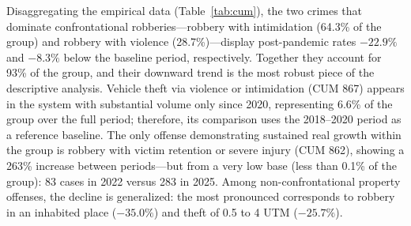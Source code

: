 \documentclass[pdflatex,sn-basic]{sn-jnl}
\begin{document}
Disaggregating the empirical data (Table~\ref{tab:cum}), the two crimes that dominate confrontational robberies---robbery with intimidation (64.3\% of the group) and robbery with violence (28.7\%)---display post-pandemic rates $-22.9\%$ and $-8.3\%$ below the baseline period, respectively. Together they account for 93\% of the group, and their downward trend is the most robust piece of the descriptive analysis. Vehicle theft via violence or intimidation (CUM 867) appears in the system with substantial volume only since 2020, representing 6.6\% of the group over the full period; therefore, its comparison uses the 2018--2020 period as a reference baseline. The only offense demonstrating sustained real growth within the group is robbery with victim retention or severe injury (CUM 862), showing a 263\% increase between periods---but from a very low base (less than 0.1\% of the group): 83 cases in 2022 versus 283 in 2025. Among non-confrontational property offenses, the decline is generalized: the most pronounced corresponds to robbery in an inhabited place ($-35.0\%$) and theft of 0.5 to 4 UTM ($-25.7\%$).
\end{document}
